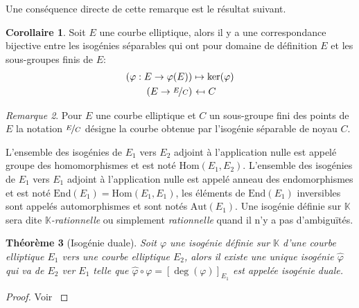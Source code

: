 \documentclass[10pt,a4paper]{book}
\theoremstyle{plain}
\newtheorem{thm}{Théorème}[chapter]
\theoremstyle{definition}
\theoremstyle{definition}
\newtheorem{cor}[thm]{Corollaire}
\theoremstyle{definition}
\theoremstyle{definition}
\theoremstyle{remark}
\newtheorem{rem}[thm]{Remarque}
\theoremstyle{remark}
\theoremstyle{definition}
\begin{document}
Une conséquence directe de cette remarque est le résultat suivant.

\begin{cor}
Soit $E$ une courbe elliptique, alors il y a une correspondance bijective entre les isogénies séparables qui ont pour domaine de définition $E$ et les sous-groupes finis de $E$:
\begin{equation*}
\begin{alignedat}{1}
(\varphi :E\rightarrow \varphi(E)) &\mapsto  \ker(\varphi)  \\
 (E\rightarrow\nicefrac{E}{C})  &\  \reflectbox{$\mapsto$} \ C 
\end{alignedat}
\end{equation*}
\end{cor}

\begin{rem}
Pour $E$ une courbe elliptique et $C$ un sous-groupe fini des points de $E$ la notation $\nicefrac{E}{C}$ désigne la courbe obtenue par l'isogénie séparable de noyau $C$.
\end{rem}

L'ensemble des isogénies de $E_1$ vers $E_2$ adjoint à l'application nulle est appelé groupe des homomorphismes et est noté \emph{$\mathrm{Hom}(E_1,E_2)$}. L'ensemble des isogénies de $E_1$ vers $E_1$ adjoint à l'application nulle est appelé anneau des endomorphismes et est noté \emph{$\mathrm{End}(E_1)=\mathrm{Hom}(E_1,E_1)$}, les éléments de $\mathrm{End}(E_1)$ inversibles sont appelés automorphismes et sont notés \emph{$\mathrm{Aut}(E_1)$}. Une isogénie définie sur $\mathbb{K}$ sera dite \emph{$\mathbb{K}$-rationnelle} ou simplement \emph{rationnelle} quand il n'y a pas d'ambiguïtés.

\begin{thm}[Isogénie duale]
Soit $\varphi$ une isogénie définie sur $\mathbb{K}$ d'une courbe elliptique 
$E_1$ vers une courbe elliptique $E_2$, alors il existe une unique isogénie 
$\widehat{\varphi}$ qui va de $E_2$ ver $E_1$ telle que $\widehat{\varphi}\circ
\varphi=[\deg(\varphi)]_{E_1}$ est appelée \emph{isogénie duale}.
\end{thm}

\begin{proof}
Voir \cite[III.6.1]{Silv1}
\end{proof}
\end{document}
